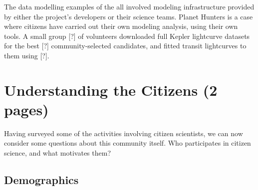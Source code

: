 \documentclass{ar2e}
\begin{document}

% 
%

  The data modelling
examples of the  all involved modeling infrastructure provided
by either the project's developers or their science teams. Planet Hunters is a
case where citizens have carried out their own modeling analysis, using their
own tools. A small group [?] of volunteers downloaded full Kepler lightcurve
datasets for the best [?] community-selected candidates, and fitted transit
lightcurves to them using [?]. 



% 



\section{Understanding the Citizens (2 pages)}
\label{sec:crowd}

Having surveyed some of the activities involving citizen scientists, we can
now consider some questions about this community itself. Who participates in
citizen science, and what motivates them?



\subsection{Demographics}
\label{sec:crowd:demographics}
\end{document}
